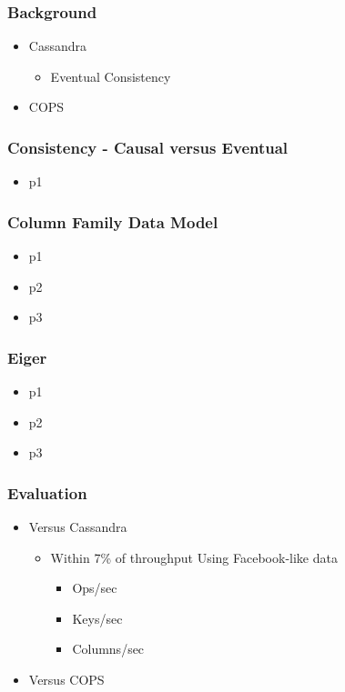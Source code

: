 \documentclass{beamer}
\begin{document}
\begin{frame}
\frametitle{Background}
\begin{itemize}
\pause \item Cassandra
	\begin{itemize}
		\item Eventual Consistency
	\end{itemize}
\pause \item COPS
\end{itemize}  
\end{frame}

\begin{frame}
\frametitle{Consistency - Causal versus Eventual}
\begin{itemize}
\pause \item p1	
\end{itemize}  
\end{frame}

\begin{frame}
\frametitle{Column Family Data Model}
\begin{itemize}
\pause \item p1 %
\pause \item p2
\pause \item p3
\end{itemize}  
\end{frame}



\begin{frame}
\frametitle{Eiger}
\begin{itemize}
\pause \item p1 %
\pause \item p2
\pause \item p3
\end{itemize}  
\end{frame}

\begin{frame}
\frametitle{Evaluation}
\begin{itemize}
\pause \item Versus Cassandra
		\begin{itemize}
			\item Within 7\% of throughput Using Facebook-like data
			\begin{itemize}
				\item Ops/sec
				\item Keys/sec
				\item Columns/sec
			\end{itemize}
		\end{itemize}
\pause \item Versus COPS
\end{itemize}  
\end{frame}
\end{document}
